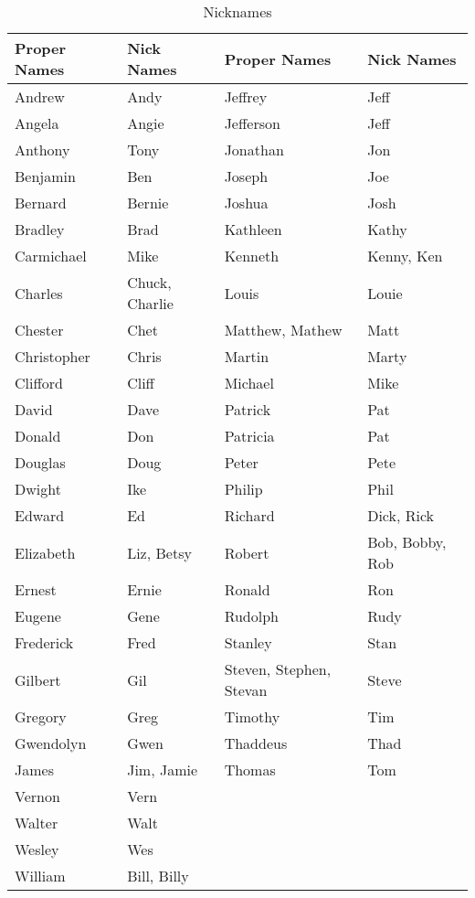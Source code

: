 \documentclass[12pt, letterpaper]{article}
\begin{document}
\begin{table}[ht]
  	\caption{Nicknames}
  	\centering
  	\begin{tabular}{l l l l}
  	\hline
    Proper Names &  Nick Names & Proper Names &  Nick Names\\
  	\hline
    Andrew		& Andy		& Jeffrey	& Jeff\\
    Angela		& Angie 	& Jefferson & Jeff\\
    Anthony		& Tony 		& Jonathan & Jon\\
    Benjamin	& Ben 		& Joseph & Joe\\
    Bernard 	& Bernie 	& Joshua & Josh\\
    Bradley 	& Brad 		& Kathleen & Kathy\\
    Carmichael 	& Mike 		& Kenneth & Kenny, Ken\\
    Charles		& Chuck, Charlie &  Louis & Louie\\
    Chester 	& Chet		&   Matthew, Mathew & Matt\\
    Christopher & Chris 	& Martin & Marty\\
    Clifford 	& Cliff 	& Michael & Mike\\
    David 		& Dave 		& Patrick & Pat\\
    Donald 		& Don 		& Patricia & Pat\\
    Douglas 	& Doug 		& Peter & Pete\\
    Dwight 		& Ike 		&  Philip & Phil\\
    Edward 		& Ed 		& Richard & Dick, Rick\\
    Elizabeth 	& Liz, Betsy &  Robert &Bob, Bobby, Rob\\
    Ernest 		& Ernie 	&  Ronald & Ron\\
    Eugene 		& Gene 		& Rudolph & Rudy\\
    Frederick 	& Fred 		&  Stanley	& Stan\\
    Gilbert 	& Gil 		& Steven, Stephen, Stevan &Steve\\
    Gregory 	& Greg 		& Timothy & Tim\\
    Gwendolyn 	& Gwen 		&  Thaddeus & Thad\\
    James 		& Jim, Jamie &  Thomas	& Tom\\
    Vernon & Vern & &\\
    Walter & Walt & &\\
    Wesley	& Wes & &\\
    William & Bill, Billy & &\\
     \hline
  	\end{tabular}
  	\label{table:taba2}
\end{table}
\clearpage
\end{document}
